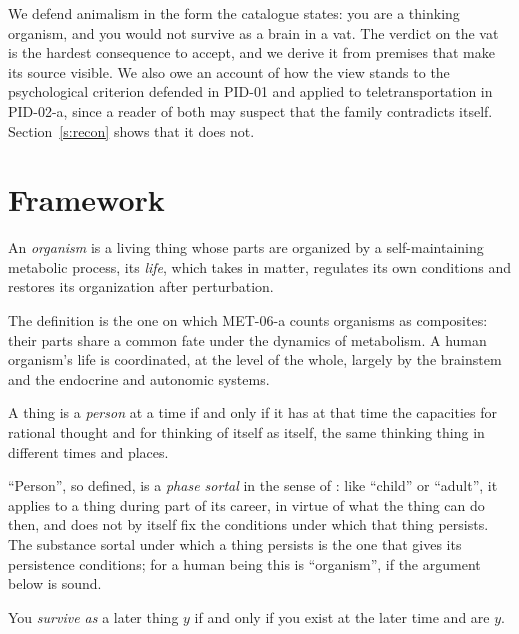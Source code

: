 \documentclass{situationist-preprint}
\begin{document}
We defend animalism in the form the catalogue states: you are a thinking organism, and you would not survive as a brain in a vat. The verdict on the vat is the hardest consequence to accept, and we derive it from premises that make its source visible. We also owe an account of how the view stands to the psychological criterion defended in PID-01 and applied to teletransportation in PID-02-a, since a reader of both may suspect that the family contradicts itself. Section~\ref{s:recon} shows that it does not.

\section{Framework}\label{s:frame}

\begin{definition}\label{d:org}
An \emph{organism} is a living thing whose parts are organized by a self-maintaining metabolic process, its \emph{life}, which takes in matter, regulates its own conditions and restores its organization after perturbation.
\end{definition}

The definition is the one on which MET-06-a counts organisms as composites: their parts share a common fate under the dynamics of metabolism. A human organism's life is coordinated, at the level of the whole, largely by the brainstem and the endocrine and autonomic systems.

\begin{definition}\label{d:person}
A thing is a \emph{person} at a time if and only if it has at that time the capacities for rational thought and for thinking of itself as itself, the same thinking thing in different times and places.
\end{definition}

\enquote{Person}, so defined, is a \emph{phase sortal} in the sense of \citet{Wiggins1980}: like \enquote{child} or \enquote{adult}, it applies to a thing during part of its career, in virtue of what the thing can do then, and does not by itself fix the conditions under which that thing persists. The substance sortal under which a thing persists is the one that gives its persistence conditions; for a human being this is \enquote{organism}, if the argument below is sound.

\begin{definition}\label{d:survive}
You \emph{survive as} a later thing $y$ if and only if you exist at the later time and are $y$.
\end{definition}
\end{document}
